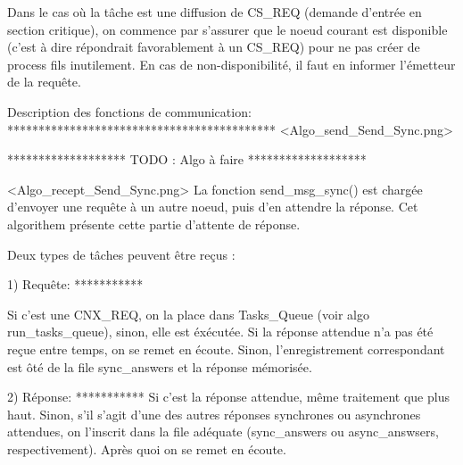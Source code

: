 Dans le cas où la tâche est une diffusion de CS_REQ (demande d'entrée en section critique), on
commence par s'assurer que le noeud courant est disponible (c'est à dire répondrait favorablement à
un CS_REQ) pour ne pas créer de process fils inutilement. En cas de non-disponibilité, il faut en
informer l'émetteur de la requête.

Description des fonctions de communication:
*******************************************
<Algo_send_Send_Sync.png>

*******************
TODO : Algo à faire
*******************

<Algo_recept_Send_Sync.png>
La fonction send_msg_sync() est chargée d'envoyer une requête à un autre noeud, puis d'en attendre
la réponse.
Cet algorithem présente cette partie d'attente de réponse.

Deux types de tâches peuvent être reçus :

1) Requête:
***********

Si c'est une CNX_REQ, on la place dans Tasks_Queue (voir algo run_tasks_queue), sinon, elle est
éxécutée. Si la réponse attendue n'a pas été reçue entre temps, on se remet en écoute. Sinon,
l'enregistrement correspondant est ôté de la file sync_answers et la réponse mémorisée.

2) Réponse:
***********
Si c'est la réponse attendue, même traitement que plus haut.
Sinon, s'il s'agit d'une des autres réponses synchrones ou asynchrones attendues, on l'inscrit dans
la file adéquate (sync_answers ou async_answsers, respectivement). Après quoi on se remet en écoute.


